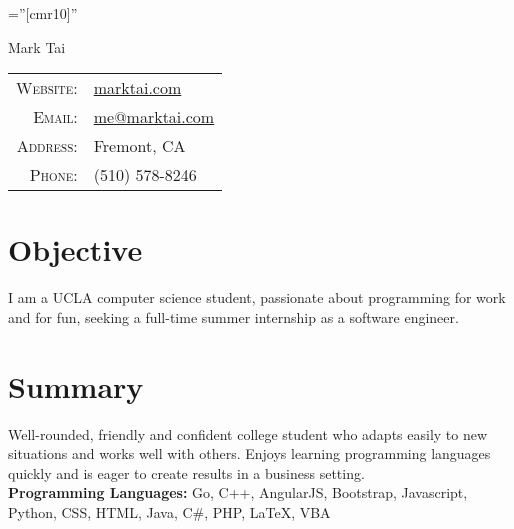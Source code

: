 \documentclass[a4paper,10pt]{article}
\begin{document}

\pagestyle{empty} %

\font\fb=''[cmr10]'' %



\begin{minipage}{0.2\textwidth}%
\par{
	\Huge Mark Tai
    \bigskip\par}
\end{minipage}%
\hfill%
\begin{minipage}{0.3\textwidth}
\begin{tabular}{r|l}
    \textsc{Website:}   & \href{http://www.marktai.com}{marktai.com}\\
    \textsc{Email:}     & \href{mailto:me@marktai.com}{me@marktai.com} \\
    \textsc{Address:}   & Fremont, CA \\
    \textsc{Phone:}     & (510) 578-8246\\
\end{tabular}
\end{minipage}

\section{Objective}
I am a UCLA computer science student, passionate about programming for work and for fun, seeking a full-time summer internship as a software engineer.

\section{Summary}
Well-rounded, friendly and confident college student who adapts easily to new situations and works well with others. Enjoys learning programming languages quickly and is eager to create results in a business setting. \\
\textbf{Programming Languages:} Go, C++, AngularJS, Bootstrap, Javascript, Python, CSS, HTML, Java, C\#, PHP, LaTeX, VBA \\
\end{document}
